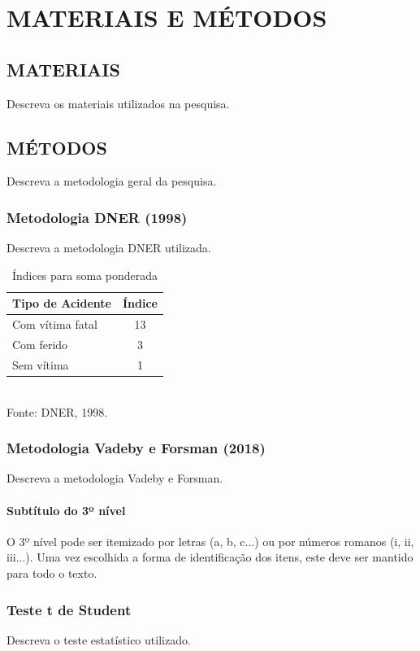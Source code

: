 \chapter{MATERIAIS E MÉTODOS} \label{capitulo2}

\section{MATERIAIS}

Descreva os materiais utilizados na pesquisa.

\section{MÉTODOS}

Descreva a metodologia geral da pesquisa.

\subsection{Metodologia DNER (1998)}

Descreva a metodologia DNER utilizada.

\begin{table}[htbp]
\centering
\caption{Índices para soma ponderada}
\label{tab:indices_ponderada}
\small
\begin{tabular}{|l|c|}
\hline
\textbf{Tipo de Acidente} & \textbf{Índice} \\
\hline
Com vítima fatal & 13 \\
\hline
Com ferido & 3 \\
\hline
Sem vítima & 1 \\
\hline
\end{tabular}
\\[0.2cm]
{\small Fonte: DNER, 1998.}
\end{table}

\subsection{Metodologia Vadeby e Forsman (2018)}

Descreva a metodologia Vadeby e Forsman.

\subsubsection{Subtítulo do 3º nível}

O 3º nível pode ser itemizado por letras (a, b, c...) ou por números romanos (i, ii, iii...). Uma vez escolhida a forma de identificação dos itens, este deve ser mantido para todo o texto.

\subsection{Teste t de Student}

Descreva o teste estatístico utilizado.
